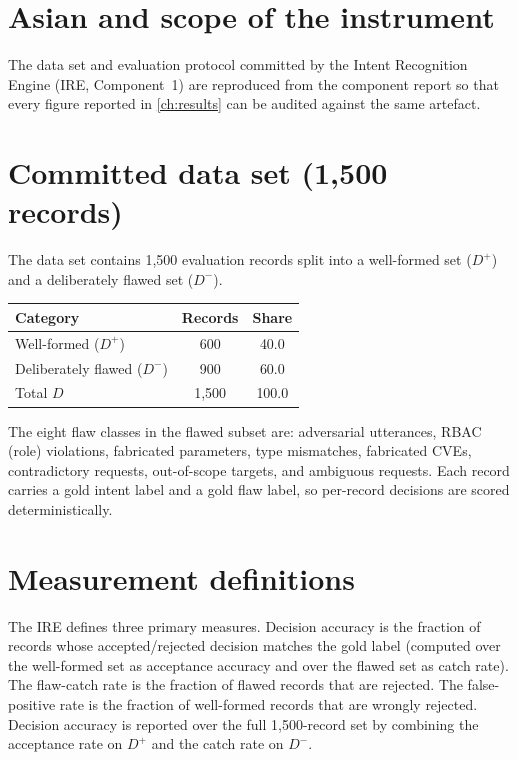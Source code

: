 \section{Asian and scope of the instrument}

The data set and evaluation protocol committed by the Intent Recognition Engine
(IRE, Component~1) are reproduced from the component report so that every figure
reported in \cref{ch:results} can be audited against the same artefact.

\section{Committed data set (1,500 records)}

The data set contains 1,500 evaluation records split into a well-formed set
(\(D^{+}\)) and a deliberately flawed set (\(D^{-}\)).

\begin{center}
\begin{tabular}{@{}lcc@{}}
  \toprule
  \textbf{Category} & \textbf{Records} & \textbf{Share}\\
  \midrule
  Well-formed (\(D^{+}\)) & 600 & 40.0\\
  Deliberately flawed (\(D^{-}\)) & 900 & 60.0\\
  \midrule
  Total \(D\) & 1,500 & 100.0\\
  \bottomrule
\end{tabular}
\end{center}

The eight flaw classes in the flawed subset are: adversarial utterances, RBAC
(role) violations, fabricated parameters, type mismatches, fabricated CVEs,
contradictory requests, out-of-scope targets, and ambiguous requests. Each
record carries a gold intent label and a gold flaw label, so per-record
decisions are scored deterministically.

\section{Measurement definitions}

The IRE defines three primary measures. Decision accuracy is the fraction of
records whose accepted/rejected decision matches the gold label (computed over
the well-formed set as acceptance accuracy and over the flawed set as catch
rate). The flaw-catch rate is the fraction of flawed records that are rejected.
The false-positive rate is the fraction of well-formed records that are wrongly
rejected. Decision accuracy is reported over the full 1,500-record set by
combining the acceptance rate on \(D^{+}\) and the catch rate on \(D^{-}\).

